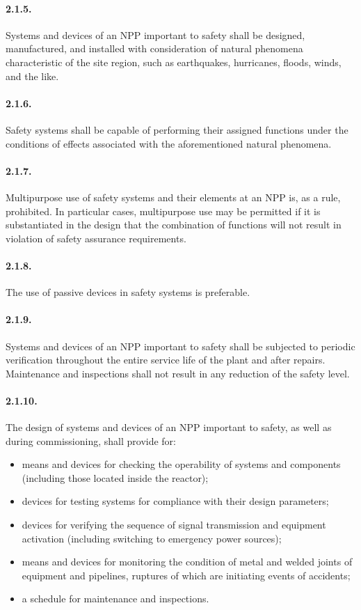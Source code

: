 \documentclass[openright]{bookest}
\begin{document}
\paragraph{2.1.5.}
Systems and devices of an NPP important to safety shall be designed, manufactured, and installed with consideration of natural phenomena characteristic of the site region, such as earthquakes, hurricanes, floods, winds, and the like.

\paragraph{2.1.6.}
Safety systems shall be capable of performing their assigned functions under the conditions of effects associated with the aforementioned natural phenomena.

\paragraph{2.1.7.}
Multipurpose use of safety systems and their elements at an NPP is, as a rule, prohibited. In particular cases, multipurpose use may be permitted if it is substantiated in the design that the combination of functions will not result in violation of safety assurance requirements.

\paragraph{2.1.8.}
The use of passive devices in safety systems is preferable.

\paragraph{2.1.9.}
Systems and devices of an NPP important to safety shall be subjected to periodic verification throughout the entire service life of the plant and after repairs. Maintenance and inspections shall not result in any reduction of the safety level.

\paragraph{2.1.10.}
The design of systems and devices of an NPP important to safety, as well as during commissioning, shall provide for:
\begin{itemize}
    \item means and devices for checking the operability of systems and components (including those located inside the reactor);
    \item devices for testing systems for compliance with their design parameters;
    \item devices for verifying the sequence of signal transmission and equipment activation (including switching to emergency power sources);
    \item means and devices for monitoring the condition of metal and welded joints of equipment and pipelines, ruptures of which are initiating events of accidents;
    \item a schedule for maintenance and inspections.
\end{itemize}
\end{document}
